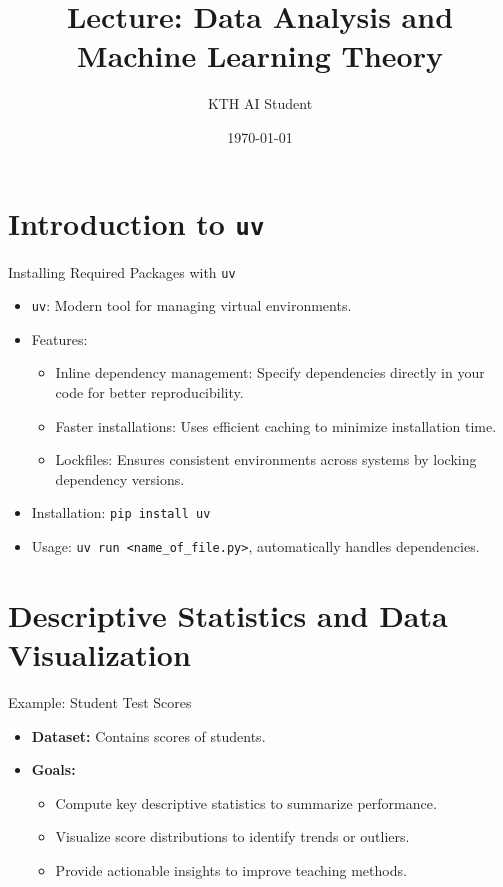 \documentclass{beamer}
\title{Lecture: Data Analysis and Machine Learning Theory}
\author{KTH AI Student}
\date{\today}
\begin{document}
\frame{\titlepage}

\section{Introduction to \texttt{uv}}
\begin{frame}{Installing Required Packages with \texttt{uv}}
\begin{itemize}
    \item \texttt{uv}: Modern tool for managing virtual environments.
    \item Features:
    \begin{itemize}
        \item Inline dependency management: Specify dependencies directly in your code for better reproducibility.
        \item Faster installations: Uses efficient caching to minimize installation time.
        \item Lockfiles: Ensures consistent environments across systems by locking dependency versions.
    \end{itemize}
    \item Installation: \texttt{pip install uv}
    \item Usage: \texttt{uv run <name\_of\_file.py>}, automatically handles dependencies.
\end{itemize}
\end{frame}

\section{Descriptive Statistics and Data Visualization}

\begin{frame}{Example: Student Test Scores}
    \begin{itemize}
        \item \textbf{Dataset:} Contains scores of students.
        \item \textbf{Goals:}
        \begin{itemize}
            \item Compute key descriptive statistics to summarize performance.
            \item Visualize score distributions to identify trends or outliers.
            \item Provide actionable insights to improve teaching methods.
        \end{itemize}
    \end{itemize}
    \end{frame}
\end{document}
